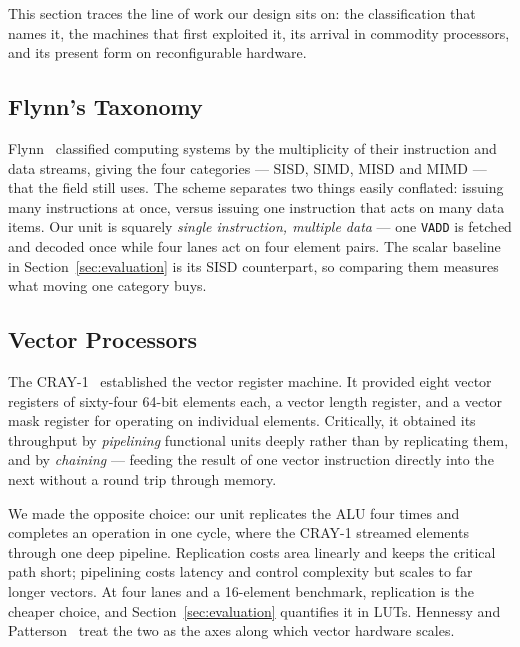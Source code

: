 
This section traces the line of work our design sits on: the classification that
names it, the machines that first exploited it, its arrival in commodity
processors, and its present form on reconfigurable hardware.

\subsection{Flynn's Taxonomy}
Flynn~\cite{flynn1966} classified computing systems by the multiplicity of their
instruction and data streams, giving the four categories --- SISD, SIMD, MISD
and MIMD --- that the field still uses. The scheme separates two things easily conflated: issuing many
instructions at once, versus issuing one instruction that acts on many data
items. Our unit is squarely \emph{single instruction, multiple data} --- one
\texttt{VADD} is fetched and decoded once while four lanes act on four element
pairs. The scalar baseline in Section~\ref{sec:evaluation} is its SISD
counterpart, so comparing them measures what moving one category buys.

\subsection{Vector Processors}
The CRAY-1~\cite{russell1978} established the vector register machine. It
provided eight vector registers of sixty-four 64-bit elements each, a vector
length register, and a vector mask register for operating on individual
elements. Critically, it obtained its throughput by \emph{pipelining} functional
units deeply rather than by replicating them, and by \emph{chaining} --- feeding
the result of one vector instruction directly into the next without a round trip
through memory.

We made the opposite choice: our unit replicates the ALU four times and
completes an operation in one cycle, where the CRAY-1 streamed elements through
one deep pipeline. Replication costs area linearly and keeps the critical path
short; pipelining costs latency and control complexity but scales to far longer
vectors. At four lanes and a 16-element benchmark, replication is the cheaper
choice, and Section~\ref{sec:evaluation} quantifies it in LUTs. Hennessy and
Patterson~\cite{hennessy2017} treat the two as the axes along which vector
hardware scales.

